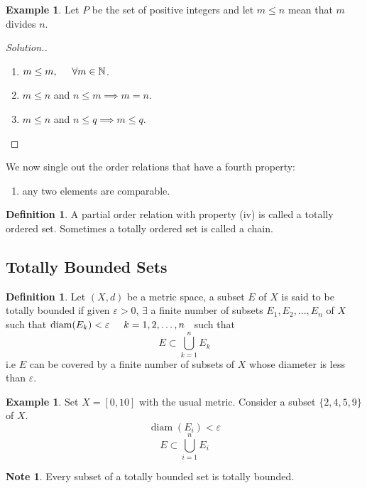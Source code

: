 \documentclass[11pt,a4paper]{article}
\theoremstyle{definition}
\newtheorem{defn}[thm]{Definition}
\newtheorem{exa}[thm]{Example}
\newtheorem*{note}{Note}
\DeclareMathOperator{\diam}{diam}
\newenvironment{solution}
  {\renewcommand{\qedsymbol}{}\begin{proof}[\textit{Solution}.]}
  {\end{proof}}
\begin{document}
\begin{exa}
Let $P$ be the set of positive integers and let $m\leq n$ mean that $m$ divides $n$.

\end{exa}
\begin{solution}
\begin{enumerate}
\item[i] $m\leq m,\hspace{0.5cm} \forall m\in \mathbb{N}$.
\item[ii] $m\leq n$ and $n\leq m\implies m=n$.
\item[iii]$m\leq n$ and $n\leq q\implies m\leq q$.
\end{enumerate}
\end{solution}
We now single out the order relations that have a fourth property:

\begin{enumerate}
\item[iv] any two elements are comparable.
\end{enumerate}


\begin{defn}
A partial order relation with property (iv) is called a totally ordered set.
Sometimes a totally ordered set is called a chain.
\end{defn}

\pagebreak
\subsection{Totally Bounded Sets}

\begin{defn}
Let $(X,d)$ be a metric space, a subset $E$ of $X$ is said to be totally bounded if given $\varepsilon>0$, $\exists$ a finite number of subsets $E_1,E_2,\dots,E_n$ of $X$ such that \hspace{0.2cm}$\diam(E_k)<\varepsilon \hspace{0.5cm} k=1,2,\dots,n\hspace{0.2cm}$ such that $$E\subset\bigcup^n_{k=1}E_k$$ i.e $E$ can be covered by a finite number of subsets of $X$ whose diameter is less than $\varepsilon$.
\end{defn}


\begin{exa}
Set $X=[0,10]$ with the usual metric. Consider a subset $\{2,4,5,9\}$ of $X$. $$\diam(E_i)<\varepsilon$$ $$E\subset \bigcup^n_{i=1}E_i$$
\begin{note}
Every subset of a totally bounded set is totally bounded.
\end{note}

\end{exa}
\end{document}
